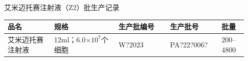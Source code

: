 \documentclass[UTF8,10pt,a4paper,fontset=fandol]{ctexart}
\newcommand{\fieldvalue}[1]{#1}
\newcommand{\handwritten}[1]{#1}
\begin{document}
\newpage

\begin{center}
{\heiti\large 艾米迈托赛注射液（Z2）批生产记录}
\end{center}

\begin{tabular}{|p{0.18\linewidth}|p{0.25\linewidth}|p{0.20\linewidth}|p{0.20\linewidth}|p{0.10\linewidth}|}
\hline
品名 & 规格 & 生产批编号 & 生产批号 & 批量 \\
\hline
艾米迈托赛注射液 &
12ml；6.0$\times 10^{7}$个细胞 &
\fieldvalue{\handwritten{W?2023}} &
\fieldvalue{\handwritten{PA?22?006?}} &
200--4800 \\
\hline
\end{tabular}

\bigskip
\end{document}
